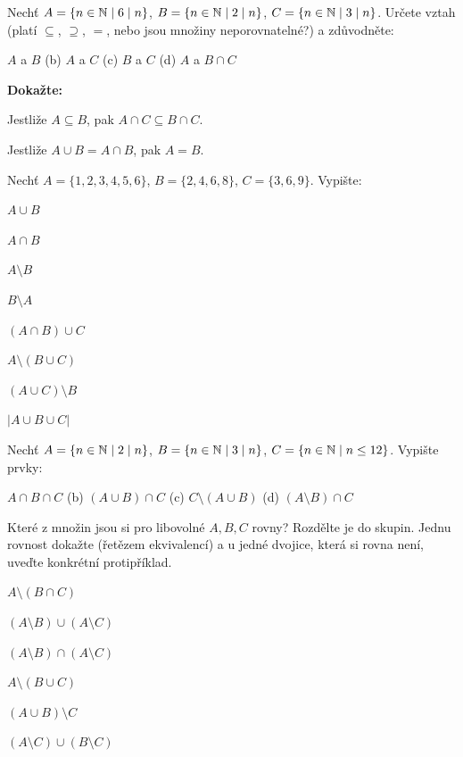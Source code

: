 \documentclass[11pt,a4paper]{article}
\begin{document}
\Needspace*{8.0cm}
Nechť $A=\{n\in\mathbb N\mid 6\mathrel{\mid} n\}$, $B=\{n\in\mathbb N\mid 2\mathrel{\mid} n\}$, $C=\{n\in\mathbb N\mid 3\mathrel{\mid} n\}$. Určete vztah (platí $\subseteq$, $\supseteq$, $=$, nebo jsou množiny neporovnatelné?) a zdůvodněte:
\begin{pol}
  \item $A$ a $B$ \qquad (b) $A$ a $C$ \qquad (c) $B$ a $C$ \qquad (d) $A$ a $B\cap C$
\end{pol}
\misto{4.6cm}

\Needspace*{11.0cm}
\textbf{Dokažte:}
\begin{pol}
  \item Jestliže $A\subseteq B$, pak $A\cap C\subseteq B\cap C$.
  \item Jestliže $A\cup B=A\cap B$, pak $A=B$.
\end{pol}
\misto{7.6cm}


\Needspace*{8.0cm}
Nechť $A=\{1,2,3,4,5,6\}$, $B=\{2,4,6,8\}$, $C=\{3,6,9\}$. Vypište:
\begin{dvasl}
  \item $A\cup B$
  \item $A\cap B$
  \item $A\setminus B$
  \item $B\setminus A$
  \item $(A\cap B)\cup C$
  \item $A\setminus(B\cup C)$
  \item $(A\cup C)\setminus B$
  \item $|A\cup B\cup C|$
\end{dvasl}
\misto{4.6cm}

\Needspace*{7.6cm}
Nechť $A=\{n\in\mathbb N\mid 2\mathrel{\mid} n\}$, $B=\{n\in\mathbb N\mid 3\mathrel{\mid} n\}$, $C=\{n\in\mathbb N\mid n\le12\}$. Vypište prvky:
\begin{pol}
  \item $A\cap B\cap C$ \quad (b) $(A\cup B)\cap C$ \quad (c) $C\setminus(A\cup B)$ \quad (d) $(A\setminus B)\cap C$
\end{pol}
\misto{4.2cm}

\Needspace*{11.8cm}
Které z množin jsou si pro libovolné $A,B,C$ rovny? Rozdělte je do skupin. Jednu rovnost dokažte (řetězem ekvivalencí) a u jedné dvojice, která si rovna není, uveďte konkrétní protipříklad.
\begin{dvasl}
  \item $A\setminus(B\cap C)$
  \item $(A\setminus B)\cup(A\setminus C)$
  \item $(A\setminus B)\cap(A\setminus C)$
  \item $A\setminus(B\cup C)$
  \item $(A\cup B)\setminus C$
  \item $(A\setminus C)\cup(B\setminus C)$
\end{dvasl}
\misto{8.4cm}
\end{document}
